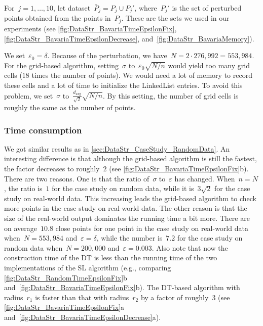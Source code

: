 For~$j=1,\ldots ,10$, 
let dataset~$\bar{P}_{j}=P_{j}\cup P_{j}'$,
where~$P_{j}'$ is the set of perturbed points 
obtained from the points in~$P_{j}$. 
These are the sets we used in our experiments
(see \figs\ref{fig:DataStr_BavariaTimeEpsilonFix}, 
\ref{fig:DataStr_BavariaTimeEpsilonDecrease}, 
and~\ref{fig:DataStr_BavariaMemory}).



We set~$\varepsilon_{0}=\delta$.
Because of the perturbation,
we have~$N=2\cdot 276{,}992=553{,}984$. 
For the grid-based algorithm, 
setting~$\sigma$ to~$\varepsilon _{0}\sqrt{N/n}$ 
would yield too many grid cells 
($18$ times the number of points). 
We would need a lot of memory to record these cells 
and a lot of time to initialize the LinkedList entries. 
To avoid this problem, we set~$\sigma$ 
to~$\frac{d_\mathrm{avg}}{\sqrt{2}}\sqrt{N/n}$.
By this setting, the number of grid cells is 
roughly the same as the number of points.



\subsubsection{Time consumption}

We got similar results as in
\sect\ref{sec:DataStr_CaseStudy_RandomData}. 
An interesting difference is that 
although the grid-based algorithm is still the fastest, 
the factor decreases to roughly~$2$
(see \fig\ref{fig:DataStr_BavariaTimeEpsilonFix}b). 
There are two reasons. 
One is that the ratio of~$\sigma$ to~$\varepsilon$ has changed. 
When~$n=N$, the ratio is~$1$ for the case study on random data,
while it is~$3\sqrt{2}$ for the case study 
on real-world data. 
This increasing leads the grid-based algorithm 
to check more points in the case study on real-world data. 
The other reason is that the size of the real-world output 
dominates the running time a bit more. 
There are on average~$10.8$ close points 
for one point in the case study on real-world data 
when~$N=553{,}984$ and~$\varepsilon =\delta$, 
while the number is~$7.2$ for the case study on random data 
when~$N=200{,}000$ and~$\varepsilon=0.003$. 
Also note that now the construction time of the DT 
is less than the running time of 
the two implementations of the SL algorithm
(e.g., comparing \figs\ref{fig:DataStr_RandomTimeEpsilonFix}b
and~\ref{fig:DataStr_BavariaTimeEpsilonFix}b). 
The DT-based algorithm with radius~$r_{1}$ is faster than 
that with radius~$r_{2}$ by a factor of roughly~$3$
(see \figs\ref{fig:DataStr_BavariaTimeEpsilonFix}a
and~\ref{fig:DataStr_BavariaTimeEpsilonDecrease}a).





